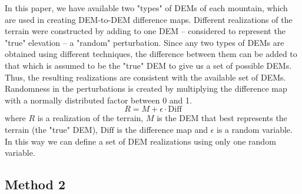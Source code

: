\documentclass[12pt]{article}
\begin{document}
In this paper, we have available two "types" of DEMs of each mountain,
which are used in creating DEM-to-DEM difference maps.  Different
realizations of the terrain were constructed by adding to one DEM --
considered to represent the "true" elevation -- a "random"
perturbation.  Since any two types of DEMs are obtained using
different techniques, the difference between them can be added to that
which is assumed to be the "true" DEM to give us a set of possible
DEMs. Thus, the resulting realizations are consistent with the
available set of DEMs. Randomness in the perturbations is created by
multiplying the difference map with a normally distributed factor
between 0 and 1.
\begin{equation}
R = M + \epsilon \cdot \mathrm{Diff}
\label{eq:two}
\end{equation}
where $R$ is a realization of the terrain, $M$ is the DEM that best
represents the terrain (the "true" DEM), $\mathrm{Diff}$ is the difference map
and $\epsilon$ is a random variable.  In this way we can define a set
of DEM realizations using only one random variable.

\subsection{Method 2}
\label{Method2}
\end{document}
